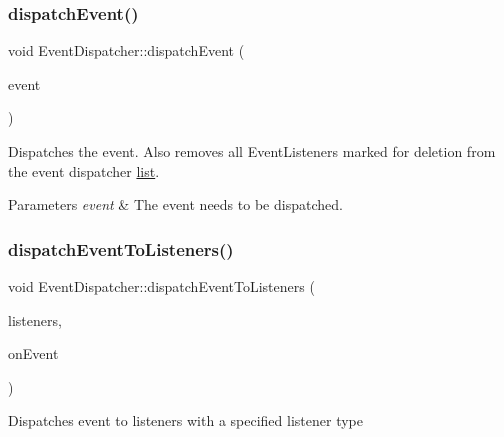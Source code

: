 \subsubsection{\texorpdfstring{dispatch\+Event()}{dispatchEvent()}\hspace{0.1cm}{\footnotesize\ttfamily [2/2]}}
{\footnotesize\ttfamily void Event\+Dispatcher\+::dispatch\+Event (\begin{DoxyParamCaption}\item[{\hyperlink{classEvent}{Event} $\ast$}]{event }\end{DoxyParamCaption})}

Dispatches the event. Also removes all Event\+Listeners marked for deletion from the event dispatcher \hyperlink{protocollist-p}{list}.


\begin{DoxyParams}{Parameters}
{\em event} & The event needs to be dispatched. \\
\hline
\end{DoxyParams}
\mbox{\label{classEventDispatcher_a5809ae1e58312586afdff6d11b821957}} 
\subsubsection{\texorpdfstring{dispatch\+Event\+To\+Listeners()}{dispatchEventToListeners()}\hspace{0.1cm}{\footnotesize\ttfamily [1/2]}}
{\footnotesize\ttfamily void Event\+Dispatcher\+::dispatch\+Event\+To\+Listeners (\begin{DoxyParamCaption}\item[{\hyperlink{classEventDispatcher_1_1EventListenerVector}{Event\+Listener\+Vector} $\ast$}]{listeners,  }\item[{const std\+::function$<$ bool(\hyperlink{classEventListener}{Event\+Listener} $\ast$)$>$ \&}]{on\+Event }\end{DoxyParamCaption})\hspace{0.3cm}{\ttfamily [protected]}}

Dispatches event to listeners with a specified listener type \mbox{\label{classEventDispatcher_a5809ae1e58312586afdff6d11b821957}} 
